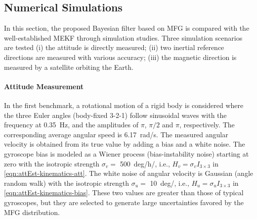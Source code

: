 \subsection{Numerical Simulations}

In this section, the proposed Bayesian filter based on MFG is compared with the well-established MEKF through simulation studies.
Three simulation scenarios are tested (i) the attitude is directly measured;
(ii) two inertial reference directions are measured with various accuracy;
(iii) the magnetic direction is measured by a satellite orbiting the Earth.

\paragraph{Attitude Measurement}

In the first benchmark, a rotational motion of a rigid body is considered where the three Euler angles (body-fixed 3-2-1) follow sinusoidal waves with the frequency at \SI{0.35}{\hertz}, and the amplitudes of $\pi$, $\pi/2$ and $\pi$, respectively.
The corresponding average angular speed is \SI{6.17}{\radian/\second}.
The measured angular velocity is obtained from its true value by adding a bias and a white noise.
The gyroscope bias is modeled as a Wiener process (bias-instability noise) starting at zero with the isotropic strength $\sigma_v = $ \SI{500}{deg/\hour/\sqrt{\second}}, i.e., $H_v = \sigma_vI_{3\times3}$ in \eqref{eqn:attEst-kinematics-att}.
The white noise of angular velocity is Gaussian (angle random walk) with the isotropic strength $\sigma_u = $ \SI{10}{deg/\sqrt{\second}}, i.e., $H_u = \sigma_uI_{3\times3}$ in \eqref{eqn:attEst-kinematics-bias}.
These two values are greater than those of typical gyroscopes, but they are selected to generate large uncertainties favored by the MFG distribution.

